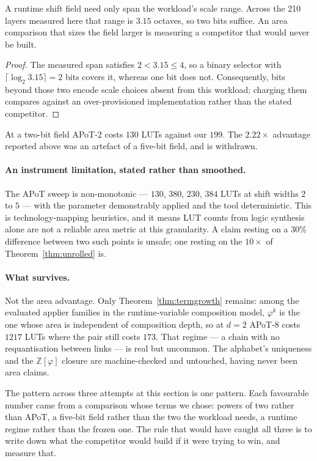 \begin{theorem}
\label{thm:barrelrange}
A runtime shift field need only span the workload's scale range. Across the 210
layers measured here that range is $3.15$ octaves, so two bits suffice. An area
comparison that sizes the field larger is measuring a competitor that would never
be built.
\end{theorem}
\begin{proof}
The measured span satisfies $2<3.15\leq4$, so a binary selector with
$\lceil\log_2 3.15\rceil=2$ bits covers it, whereas one bit does not.
Consequently, bits beyond those two encode scale choices absent from this
workload; charging them compares against an over-provisioned implementation
rather than the stated competitor.
\end{proof}

At a two-bit field APoT-2 costs $130$ LUTs against our $199$. The $2.22\times$
advantage reported above was an artefact of a five-bit field, and is withdrawn.

\paragraph{An instrument limitation, stated rather than smoothed.} The APoT sweep
is non-monotonic --- $130$, $380$, $230$, $384$ LUTs at shift widths $2$ to $5$
--- with the parameter demonstrably applied and the tool deterministic. This is
technology-mapping heuristics, and it means LUT counts from logic synthesis alone
are not a reliable area metric at this granularity. A claim resting on a $30\%$
difference between two such points is unsafe; one resting on the $10\times$ of
Theorem~\ref{thm:unrolled} is.

\paragraph{What survives.} Not the area advantage. Only
Theorem~\ref{thm:termgrowth} remains: among the evaluated applier families in the
runtime-variable composition model, $\varphi^{k}$ is the one whose
area is independent of composition depth, so at $d=2$ APoT-8 costs $1217$ LUTs
where the pair still costs $173$. That regime --- a chain with no requantisation
between links --- is real but uncommon. The alphabet's uniqueness and the
$\mathbb{Z}[\varphi]$ closure are machine-checked and untouched, having never
been area claims.

The pattern across three attempts at this section is one pattern. Each favourable
number came from a comparison whose terms we chose: powers of two rather than
APoT, a five-bit field rather than the two the workload needs, a runtime regime
rather than the frozen one. The rule that would have caught all three is to write
down what the competitor would build if it were trying to win, and measure that.





